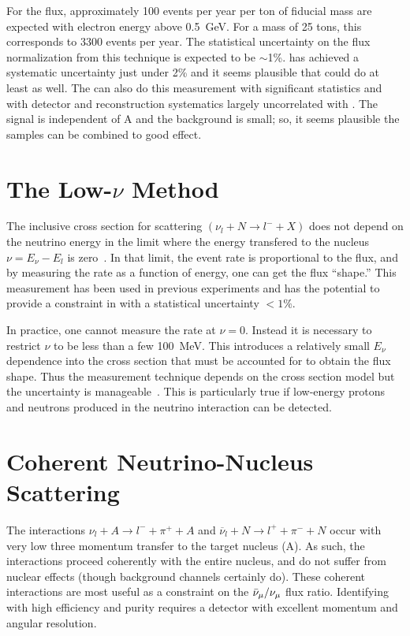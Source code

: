 For the  flux, approximately \num{100} events per year per ton of fiducial mass are expected with electron energy above \SI{0.5}{GeV}. For a  mass of 25 tons, this corresponds to \num{3300} events per year. The statistical uncertainty on the flux normalization from this technique is expected to be $\sim$1\%.  has achieved a systematic uncertainty just under 2\% and it seems plausible that \dune could do at least as well\cite{bib:minervanue}. The  can also do this measurement with significant statistics and with detector and reconstruction systematics largely uncorrelated with .  The signal is independent of A and the background is small; so, it seems plausible the samples can be combined to good effect.


\section{The Low-$\nu$ Method}
\label{ssec:intro-low-nu}
The inclusive cross section for  scattering $(\nu_l+N\rightarrow l^-+X)$ does not depend on the neutrino energy in the limit where the energy transfered to the nucleus $\nu = E_\nu-E_{l} $ is zero~\cite{bib:original_lownu}.  In that limit, the event rate is proportional to the flux, and by measuring the rate as a function of energy, one can get the flux ``shape.'' This measurement has been used in previous experiments and has the potential to provide a constraint in \dune with a statistical uncertainty $<1\%$.

In practice, one cannot measure the rate at $\nu=0$. Instead it is necessary to restrict $\nu$ to be less than a few \SI{100}{MeV}.  This introduces a relatively small $E_\nu$ dependence into the cross section that must be accounted for to obtain the flux shape. Thus the  measurement technique depends on the cross section model but the uncertainty is manageable~\cite{bib:bodek_lownu}. This is particularly true if low-energy protons and neutrons produced in the neutrino interaction can be detected. 

\section{Coherent Neutrino-Nucleus Scattering}
The interactions $\nu_l + A \rightarrow l^- + \pi^+ + A$ and 
$\overline{\nu}_l + N    \rightarrow l^+ + \pi^- + N$  %
occur with very low three momentum transfer to the target nucleus (A).  As such, the interactions proceed coherently with the entire nucleus, and do not suffer from nuclear effects (though background channels certainly do). These coherent interactions are most useful as a constraint on the $\bar\nu_\mu/\nu_\mu$ flux ratio. Identifying with high efficiency and purity requires a detector with excellent momentum and angular resolution.

